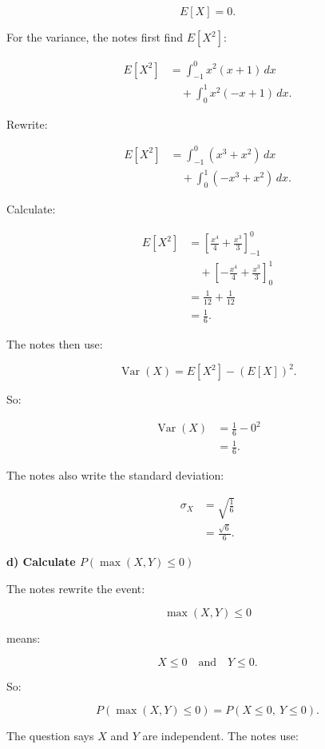 \documentclass[10pt]{article}
\begin{document}
\[
E[X]=0.
\]

For the variance, the notes first find \(E[X^2]\):

\begin{align*}
E[X^2]
&=
\int_{-1}^{0}x^2(x+1)\,dx \\
&\quad+
\int_{0}^{1}x^2(-x+1)\,dx.
\end{align*}

Rewrite:

\begin{align*}
E[X^2]
&=
\int_{-1}^{0}(x^3+x^2)\,dx \\
&\quad+
\int_{0}^{1}(-x^3+x^2)\,dx.
\end{align*}

Calculate:

\begin{align*}
E[X^2]
&=
\left[
\frac{x^4}{4}
+\frac{x^3}{3}
\right]_{-1}^{0} \\
&\quad+
\left[
-\frac{x^4}{4}
+\frac{x^3}{3}
\right]_{0}^{1} \\[2mm]
&=
\frac{1}{12}
+\frac{1}{12} \\[2mm]
&=
\frac{1}{6}.
\end{align*}

The notes then use:

\[
\operatorname{Var}(X)
=
E[X^2]-(E[X])^2.
\]

So:

\begin{align*}
\operatorname{Var}(X)
&=
\frac{1}{6}-0^2 \\[2mm]
&=
\frac{1}{6}.
\end{align*}

The notes also write the standard deviation:

\begin{align*}
\sigma_X
&=
\sqrt{\frac{1}{6}} \\[2mm]
&=
\frac{\sqrt{6}}{6}.
\end{align*}

\textbf{d) Calculate \(P(\max(X,Y)\le 0)\)}

The notes rewrite the event:

\[
\max(X,Y)\le 0
\]

means:

\[
X\le 0
\quad \text{and} \quad
Y\le 0.
\]

So:

\[
P(\max(X,Y)\le 0)
=
P(X\le 0,\ Y\le 0).
\]

The question says \(X\) and \(Y\) are independent.
The notes use:
\end{document}
